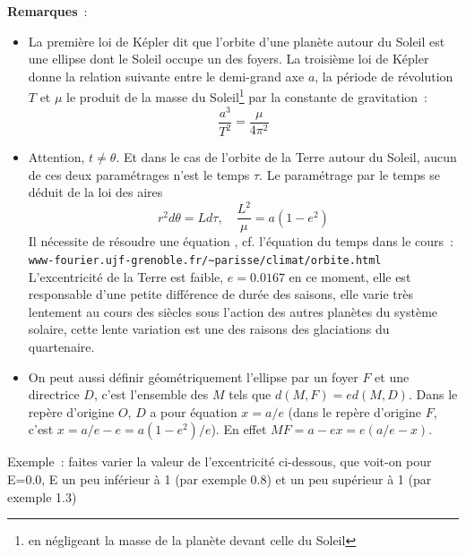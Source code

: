 \documentclass[a4paper,11pt]{article}
\begin{document}
\begin{giacjshere}
{\bf Remarques}~:
\begin{itemize}
\item La premi\`ere loi de K\'epler dit que l'orbite d'une plan\`ete
autour du Soleil est une ellipse dont le Soleil occupe un des foyers.
La troisi\`eme loi de K\'epler donne la relation suivante entre le
demi-grand axe $a$, la p\'eriode de r\'evolution $T$ et $\mu$
le produit de la masse du Soleil\footnote{en n\'egligeant la masse
de la plan\`ete devant celle du Soleil} par la constante de gravitation~:
$$ \frac{a^3}{T^2} = \frac{\mu}{4\pi^2}$$
\item Attention, $t\neq \theta$. Et dans le cas de l'orbite
de la Terre autour du Soleil, aucun de ces deux param\'etrages n'est
le temps $\tau$. Le param\'etrage par le temps se d\'eduit de la loi
des aires
\[ r^2 d\theta =  L d\tau , \quad
 \frac{L^2}{\mu}= a(1-e^2) \]
Il n\'ecessite de r\'esoudre
une \'equation , cf. l'\'equation du temps dans le cours~:\\
\verb|www-fourier.ujf-grenoble.fr/~parisse/climat/orbite.html|\\
L'excentricit\'e de la Terre est faible, $e=0.0167$ en
ce moment, elle est responsable d'une petite diff\'erence 
de dur\'ee des saisons, elle varie tr\`es lentement au cours des si\`ecles sous
l'action des autres plan\`etes du syst\`eme solaire, cette lente variation
est une des raisons des glaciations du quartenaire.
\item On peut aussi d\'efinir g\'eom\'etriquement l'ellipse
par un foyer $F$ et une directrice $D$, c'est l'ensemble des $M$ tels
que $d(M,F)=ed(M,D)$. Dans le rep\`ere d'origine $O$, $D$
a pour \'equation $x=a/e$ (dans le rep\`ere d'origine $F$, c'est
$x=a/e-e=a(1-e^2)/e$). En effet $MF=a-ex=e(a/e-x)$.
\end{itemize}
Exemple~: faites varier la valeur de l'excentricit\'e ci-dessous, que
voit-on pour E=0.0, E un peu inf\'erieur \`a 1 (par exemple 0.8) et un peu sup\'erieur
\`a 1 (par exemple 1.3)\\


\end{giacjshere}
\end{document}

